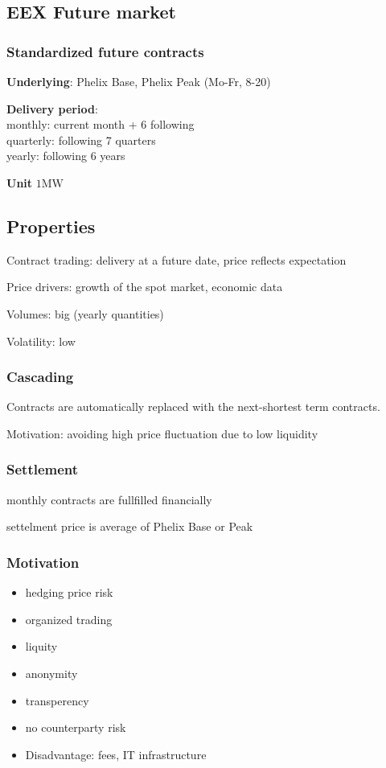 \documentclass[fs, footer]{latex4ei}
\begin{document}
\begin{multicols*}{4}
 \subsection*{EEX Future market}

\subsubsection*{Standardized future contracts}

 \textbf{Underlying}: Phelix Base, Phelix Peak (Mo-Fr, 8-20)

 \textbf{Delivery period}:\\
 monthly: current month + 6 following \\
 quarterly: following 7 quarters \\
 yearly: following 6 years

 \textbf{Unit} $1 \si{\mega \watt}$ 

 \subsection*{Properties} 
 Contract trading: delivery at a future date, price reflects expectation

 Price drivers: growth of the spot market, economic data

 Volumes: big (yearly quantities)

 Volatility: low

 \subsubsection*{Cascading}
 Contracts are automatically replaced with the next-shortest term contracts.

 Motivation: avoiding high price fluctuation due to low liquidity

 \subsubsection*{Settlement}
 monthly contracts are fullfilled financially  

 settelment price is average of Phelix Base or Peak

 \subsubsection*{Motivation}

 \begin{itemize}
  	\item hedging price risk
  	\item organized trading
  	\item liquity
  	\item anonymity
  	\item transperency
  	\item no counterparty risk
  	\item Disadvantage: fees, IT infrastructure
  \end{itemize} 


\end{multicols*}
\end{document}
